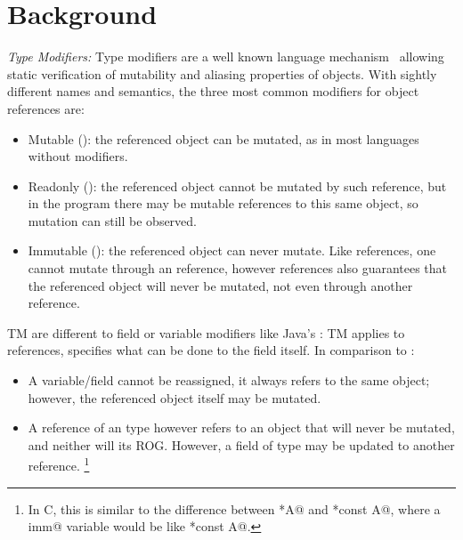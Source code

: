 

\section{Background}
\label{s:background}
\noindent\textit{Type Modifiers:}
Type modifiers are a well known language mechanism~\cite{TschantzErnst05,BirkaErnst04,OstlundEtAl08,clebsch2015deny,GianniniEtAl16,GordonEtAl12} allowing static verification of mutability and aliasing properties of objects.
With sightly different names and semantics, the three most common modifiers for object references are:
\begin{itemize}
\item Mutable (\Q@mut@): the referenced object can be mutated, as in most languages without modifiers.
\item Readonly (\Q@read@): the referenced object cannot be mutated by such reference, but in the program there may be mutable references to this same object, so mutation can still be observed. 
\item Immutable (\Q@imm@): the referenced object can never mutate. Like \Q@read@ references, one cannot mutate through an \Q@imm@ reference, however \Q@imm@ references also guarantees that the referenced object will never be mutated, not even through another reference.
\end{itemize}
TM are different to field or variable modifiers like Java’s \Q@final@: TM applies to references,  \Q@final@ specifies what can be done to the field itself. In comparison to \Q@imm@:

\begin{itemize}
\item A \Q@final@ variable/field cannot be reassigned, it always refers to the same object; however, the referenced object itself may be mutated.
\item A reference of an \Q@imm@ type however refers to an object that will never be mutated, and neither will its ROG. However, a field of type \Q@imm@ may be updated to another \Q@imm@ reference.
\footnote{In C, this is similar to the difference between \Q@const *A@ and \Q@*const A@, where a \Q@final imm@ variable would be like \Q@const *const A@.}
\end{itemize}



